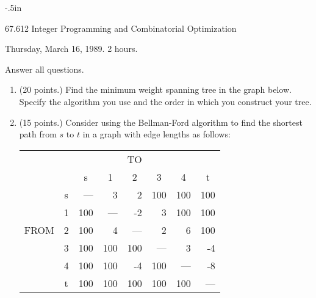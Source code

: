 
\oddsidemargin -.5in
\textheight 9in
\textwidth 7.2in
\topmargin -30pt
\headsep 0pt
\headheight 0pt



\begin{center}
   67.612 Integer Programming and Combinatorial Optimization
\end{center}

\begin{center}
   Thursday, March 16, 1989. \hspace{1in}  2 hours.
\end{center}

Answer all questions.

\begin{enumerate}
   \item  (20 points.)
          Find the minimum weight spanning tree in the graph below.
          Specify the algorithm you use and the order in which you
          construct your tree.

   \newpage

   \item  (15 points.)
          Consider using the Bellman-Ford algorithm to find the shortest
          path from $s$ to $t$ in a graph with edge lengths as follows:

\begin{tabular}{lc|rrrrrr|}
   \multicolumn{4}{c}{} & TO &  \multicolumn{3}{c}{}  \\
   \multicolumn{2}{c}{}  &  \multicolumn{1}{c}{s}
                       &  \multicolumn{1}{c}{1}
                       &  \multicolumn{1}{c}{2}
                       &  \multicolumn{1}{c}{3}
                       &  \multicolumn{1}{c}{4}
                       &  \multicolumn{1}{c}{t}   \\
  \cline{3-8}
   &  s  &  ---  &   3   &   2   &  100  &  100  &  100  \\
   &  1  &  100  &  ---  &  -2   &   3   &  100  &  100  \\
  FROM
   &  2  &  100  &   4   &  ---  &   2   &   6   &  100  \\
   &  3  &  100  &  100  &  100  &  ---  &   3   &  -4   \\
   &  4  &  100  &  100  &  -4   &  100  &  ---  &  -8   \\
   &  t  &  100  &  100  &  100  &  100  &  100  &  ---  \\
  \cline{3-8}
\end{tabular}


\end{enumerate}
